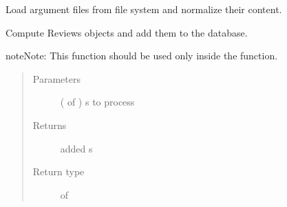 \documentclass[letterpaper,10pt,english]{sphinxmanual}
\begin{document}
\begin{fulllineitems}
\label{\detokenize{index:loacore.process.review_process.add_reviews_from_files}}
Load argument files from file system and normalize their content.

Compute Reviews objects and add them to the database.

\begin{sphinxadmonition}{note}{Note:}
This function should be used only inside the  function.
\end{sphinxadmonition}
\begin{quote}\begin{description}
\item[{Parameters}] \leavevmode
{} ( of ) \textendash{}  s to process

\item[{Returns}] \leavevmode
added  s

\item[{Return type}] \leavevmode
{} of 

\end{description}\end{quote}

\end{fulllineitems}

\end{document}
